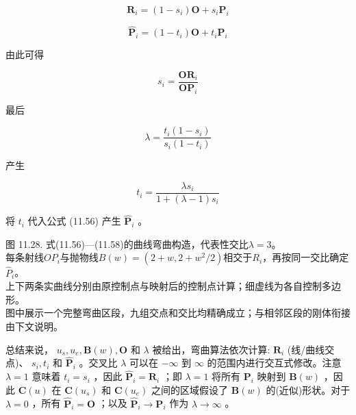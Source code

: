 \documentclass[../main.tex]{subfiles}
\begin{document}
\[
{\mathbf{R}}_{i} = \left( {1 - {s}_{i}}\right) \mathbf{O} + {s}_{i}{\mathbf{P}}_{i}
\]


\[
{\widehat{\mathbf{P}}}_{i} = \left( {1 - {t}_{i}}\right) \mathbf{O} + {t}_{i}{\mathbf{P}}_{i} \tag{11.56}
\]





由此可得

\[
{s}_{i} = \frac{{\mathbf{{OR}}}_{i}}{{\mathbf{{OP}}}_{i}} \tag{11.57}
\]

最后

\[
\lambda  = \frac{{t}_{i}\left( {1 - {s}_{i}}\right) }{{s}_{i}\left( {1 - {t}_{i}}\right) }
\]

产生

\[
{t}_{i} = \frac{\lambda {s}_{i}}{1 + \left( {\lambda  - 1}\right) {s}_{i}} \tag{11.58}
\]

将 \({t}_{i}\) 代入公式 (11.56) 产生 \({\widehat{\mathbf{P}}}_{i}\) 。

\begin{center}
\begin{minipage}{26cm}
\centering
{}
\par\smallskip
图 11.28. 式(11.56)—(11.58)的曲线弯曲构造，代表性交比$\lambda=3$。\\
每条射线$OP_i$与抛物线$B(w)=(2+w,2+w^2/2)$相交于$R_i$，再按同一交比确定$\widehat P_i$。\\
上下两条实曲线分别由原控制点与映射后的控制点计算；细虚线为各自控制多边形。\\
图中展示一个完整弯曲区段，九组交点和交比均精确成立；与相邻区段的刚体衔接由下文说明。
\end{minipage}
\end{center}

总结来说， \({u}_{s},{u}_{e},\mathbf{B}\left( w\right) ,\mathbf{O}\) 和 \(\lambda\) 被给出，弯曲算法依次计算: \({\mathbf{R}}_{i}\) (线/曲线交点)、 \({s}_{i},{t}_{i}\) 和 \({\widehat{\mathbf{P}}}_{i}\) 。交叉比 \(\lambda\) 可以在 \(- \infty\) 到 \(\infty\) 的范围内进行交互式修改。注意 \(\lambda  = 1\) 意味着 \({t}_{i} = {s}_{i}\) ，因此 \({\widehat{\mathbf{P}}}_{i} = {\mathbf{R}}_{i}\) ；即 \(\lambda  = 1\) 将所有 \({\mathbf{P}}_{i}\) 映射到 \(\mathbf{B}\left( w\right)\) ，因此 \(\mathbf{C}\left( u\right)\) 在 \(\mathbf{C}\left( {u}_{s}\right)\) 和 \(\mathbf{C}\left( {u}_{e}\right)\) 之间的区域假设了 \(\mathbf{B}\left( w\right)\) 的(近似)形状。对于 \(\lambda  = 0\) ，所有 \({\widehat{\mathbf{P}}}_{i} = \mathbf{O}\) ；以及 \({\widehat{\mathbf{P}}}_{i} \rightarrow  {\mathbf{P}}_{i}\) 作为 \(\lambda  \rightarrow  \infty\) 。
\end{document}
